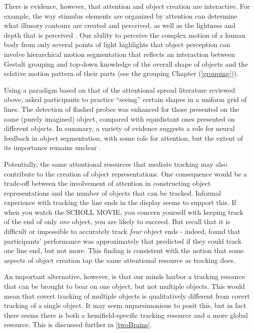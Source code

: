 \documentclass[
]{book}
\begin{document}
There is evidence, however, that attention and object creation are interactive. For example, the way stimulus elements are organized by attention can determine what illusory contours are created and perceived, as well as the lightness and depth that is perceived \citep{harrisonVoluntaryControlIllusory2019, harrisonAttentionalSelectionIllusory2019, peterVoluntaryAttentionModulates2005}. Our ability to perceive the complex motion of a human body from only several points of light highlights that object perception can involve hierarchical motion segmentation that reflects an interaction between Gestalt grouping and top-down knowledge of the overall shape of objects and the relative motion pattern of their parts \citep{johanssonJohanssonVisualPerception1973, wangSearchingLifeMotion2010} (see the grouping Chapter (\ref{grouping})).

Using a paradigm based on that of the attentional spread literature reviewed above, \citet{ongchocoHowCreateObjects2019} asked participants to practice ``seeing'' certain shapes in a uniform grid of lines. The detection of flashed probes was enhanced for those presented on the same (purely imagined) object, compared with equidistant ones presented on different objects. In summary, a variety of evidence suggests a role for neural feedback in object segmentation, with some role for attention, but the extent of its importance remains unclear \citep{papaleInfluenceObjecthoodRepresentation2021, wyatteEarlyRecurrentFeedback2014, harrisonVoluntaryControlIllusory2019}.

Potentially, the same attentional resources that mediate tracking may also contribute to the creation of object representations. One consequence would be a trade-off between the involvement of attention in constructing object representations and the number of objects that can be tracked. Informal experience with tracking the line ends in the \citet{schollObjectsAttentionState2001} display seems to support this. If when you watch the SCHOLL MOVIE, you concern yourself with keeping track of the end of only \emph{one} object, you are likely to succeed. But recall that it is difficult or impossible to accurately track \emph{four} object ends - indeed, \citet{schollObjectsAttentionState2001} found that participants' performance was approximately that predicted if they could track one line end, but not more. This finding is consistent with the notion that some aspects of object creation tap the same attentional resource as tracking does.

An important alternative, however, is that our minds harbor a tracking resource that can be brought to bear on one object, but not multiple objects. This would mean that covert tracking of multiple objects is qualitatively different from covert tracking of a single object. It may seem unparsimonious to posit this, but in fact there seems there is both a hemifield-specific tracking resource and a more global resource. This is discussed further in \ref{twoBrains}.
\end{document}
